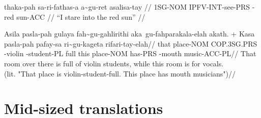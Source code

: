 \ex
\begingl
\gla thaka-pah sa-ri-fathas-a   a\~{}gu-ret   asalisa-tay //
\glb 1SG-NOM   IPFV-INT-see-PRS \agradj{}-red sun-ACC //
\glft ``I stare into the red sun'' //
\endgl
\xe

\ex
\begingl
\gla Asila pasla-pah gulaya      fah\~{}gu-gahlirithi aka~gu-fahparakala-elah akath.
+ Kasa pasla-pah pafay-sa ri\~{}gu-kageta  rifari-tay-elah//
\glb that  place-NOM COP.3SG.PRS \agradj{}-violin    \agradj{}-student-PL      full   this place-NOM has-PRS  \agradj{}-mouth music-ACC-PL//
\glft That room over there is full of violin students, while this room is for vocals. \\
     (lit. "That place is violin-student-full. This place has mouth musicians")//
\endgl
\xe



\chapter{Mid-sized translations}

\newpage

\newpage


\newpage
